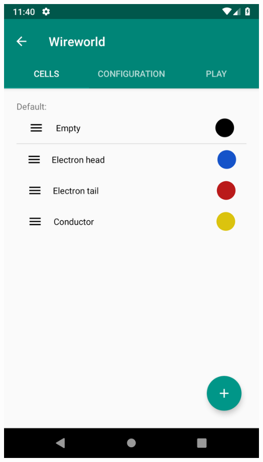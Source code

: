 \documentclass{report}
\begin{document}
\begin{minipage}{.45\textwidth}
\begin{minipage}{.45\linewidth}
    \includegraphics[width=\linewidth]{screens/cells.png}
  \end{minipage}\hfill
\end{minipage} \hfill
\end{document}
